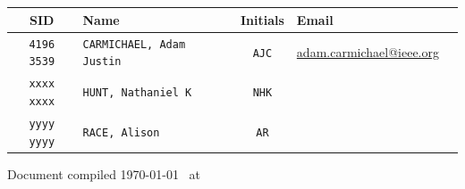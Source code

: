 \begin{titlingpage}
\begin{center}

\textsc{\LARGE \MyInstitution }\\[1.5cm]
\HRule \\[0.9cm]

{ \huge \bfseries \MyTitle }\\[0.4cm] \HRule \\[1.5cm]

\vfill

\begin{tabularx}{\linewidth}{ c X c X X }
\hline
  SID & Name & Initials & Email \\
  \hline
  \texttt{4196 3539} & \texttt{CARMICHAEL, Adam Justin}  & \texttt{AJC} & \url{adam.carmichael@ieee.org} \\
  \texttt{xxxx xxxx} & \texttt{HUNT, Nathaniel K} & \texttt{NHK} & \\
  \texttt{yyyy yyyy} & \texttt{RACE, Alison} & \texttt{AR} & \\
\end{tabularx}

\vspace{1cm}
\small{Document compiled \today ~ at \currenttime}
\end{center}

\end{titlingpage}